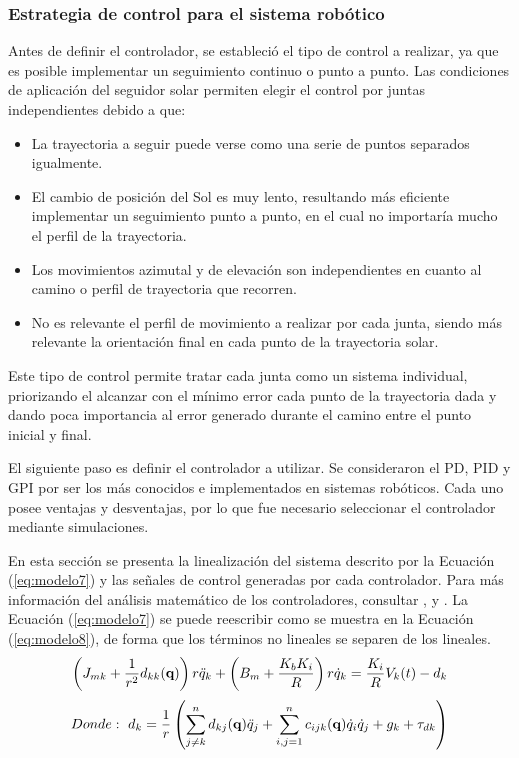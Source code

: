 \subsubsection{Estrategia de control para el sistema robótico}
Antes de definir el controlador, se estableció el tipo de control a realizar, ya que es posible implementar un seguimiento continuo o punto a punto. Las condiciones de aplicación del seguidor solar permiten elegir el control por juntas independientes debido a que:

\begin{itemize}
    \item La trayectoria a seguir puede verse como una serie de puntos separados igualmente.
    \item El cambio de posición del Sol es muy lento, resultando más eficiente implementar un seguimiento punto a punto, en el cual no importaría mucho el perfil de la trayectoria.
    \item Los movimientos azimutal y de elevación son independientes en cuanto al camino o perfil de trayectoria que recorren.
    \item No es relevante el perfil de movimiento a realizar por cada junta, siendo más relevante la orientación final en cada punto de la trayectoria solar.
\end{itemize}

Este tipo de control permite tratar cada junta como un sistema individual, priorizando el alcanzar con el mínimo error cada punto de la trayectoria dada y dando poca importancia al error generado durante el camino entre el punto inicial y final.

El siguiente paso es definir el controlador a utilizar. Se consideraron el PD, PID y GPI por ser los más conocidos e implementados en sistemas robóticos. Cada uno posee ventajas y desventajas, por lo que fue necesario seleccionar el controlador mediante simulaciones.

En esta sección se presenta la linealización del sistema descrito por la Ecuación (\ref{eq:modelo7}) y las señales de control generadas por cada controlador. Para más información del análisis matemático de los controladores, consultar \cite{DDA11}, \cite{DDA12} y \cite{DDA15}. La Ecuación (\ref{eq:modelo7}) se puede reescribir como se muestra en la Ecuación (\ref{eq:modelo8}), de forma que los términos no lineales se separen de los lineales.
\begin{equation} \label{eq:modelo8}
    \left(J_{mk}+\frac{1}{r^2}d_{kk} (\textbf{q})\right)r\Ddot{q}_k+\left(B_m+\frac{K_b K_i}{R}\right)r\Dot{q}_k=\frac{K_i}{R} V_k (t)-d_k
\end{equation}
\begin{equation}
    Donde:\ d_k=\frac{1}{r}\left(\sum _{j \neq k}^{n}d_{kj} (\textbf{q})\Ddot{q}_j + \sum _{i,j=1}^{n}c_{ijk} (\textbf{q})\Dot{q}_i\Dot{q}_j +g_k +\tau_{dk}\right)
\end{equation}

